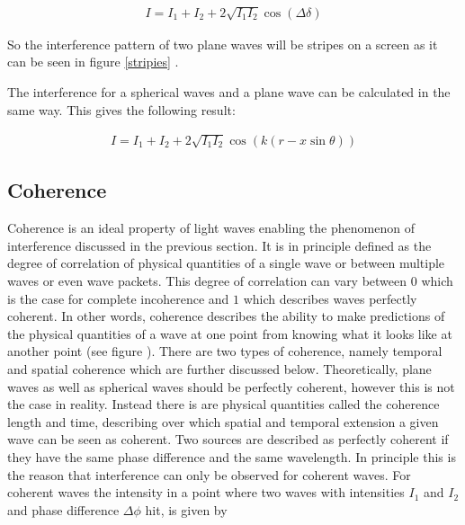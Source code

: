 \begin{align}
I=I_1+I_2 +2 \sqrt{I_1I_2}\cos(\Delta \delta) \label{Intensity}
\end{align}

So the interference pattern of two plane waves will be stripes on a screen as it can be seen in figure \ref{stripies} . \cite{staats}


The interference for a spherical waves and a plane wave can be calculated in the same way. This gives the following result:

\begin{align}
I=I_1+I_2+2\sqrt{I_1I_2}\cos(k(r-x\sin\theta))
\end{align}



\subsection{Coherence \label{Coherence section}}

Coherence is an ideal property of light waves enabling the phenomenon of interference discussed in the previous section. It is in principle defined as the degree of correlation of physical quantities of a single wave or between multiple waves or even wave packets. This degree of correlation can vary between $0$ which is the case for complete incoherence and $1$ which describes waves perfectly coherent. In other words, coherence describes the ability to make predictions of the physical quantities of a wave at one point from knowing what it looks like at another point (see figure ). There are two types of coherence, namely temporal and spatial coherence which are further discussed below. Theoretically, plane waves as well as spherical waves should be perfectly coherent, however this is not the case in reality. Instead there is are physical quantities called the coherence length and time, describing over which spatial and temporal extension a given wave can be seen as coherent. Two sources are described as perfectly coherent if they have the same phase difference and the same wavelength. In principle this is the reason that interference can only be observed for coherent waves. For coherent waves the intensity in a point where two waves with intensities $I_1$ and $I_2$ and phase difference $\Delta \phi$ hit, is given by

